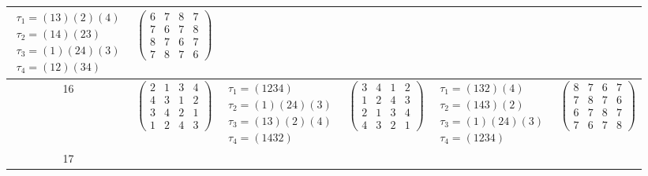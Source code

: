 \begin{longtable}{|c|p{2.7cm}|p{2.7cm}|p{2.7cm}|p{2.7cm}|p{2.7cm}|}
    $\begin{array}{l}\tau_{1}=(13)(2)(4)\\ \tau_{2}=(14)(23)\\ \tau_{3}=(1)(24)(3)\\ \tau_{4}=(12)(34)\end{array}$ &
    $\begin{pmatrix} 6 & 7 & 8 & 7 \\ 7 & 6 & 7 & 8 \\ 8 & 7 & 6 & 7 \\ 7 & 8 & 7 & 6 \end{pmatrix}$                                                                                           \\
    \hline
    16                                                                                                             &
    $\begin{pmatrix} 2 & 1 & 3 & 4 \\ 4 & 3 & 1 & 2 \\ 3 & 4 & 2 & 1 \\ 1 & 2 & 4 & 3 \end{pmatrix}$               &
    $\begin{array}{l}\tau_{1}=(1234)\\ \tau_{2}=(1)(24)(3)\\ \tau_{3}=(13)(2)(4)\\ \tau_{4}=(1432)\end{array}$     &
    $\begin{pmatrix} 3 & 4 & 1 & 2 \\ 1 & 2 & 4 & 3 \\ 2 & 1 & 3 & 4 \\ 4 & 3 & 2 & 1 \end{pmatrix}$               &
    $\begin{array}{l}\tau_{1}=(132)(4)\\ \tau_{2}=(143)(2)\\ \tau_{3}=(1)(24)(3)\\ \tau_{4}=(1234)\end{array}$     &
    $\begin{pmatrix} 8 & 7 & 6 & 7 \\ 7 & 8 & 7 & 6 \\ 6 & 7 & 8 & 7 \\ 7 & 6 & 7 & 8 \end{pmatrix}$                                                                                           \\
    \hline
    17                                                                                                             &

\end{longtable}
